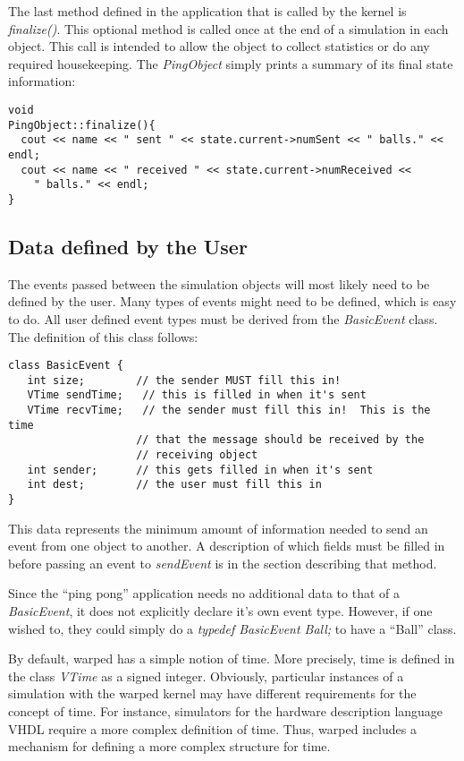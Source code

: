 \documentclass[11pt]{report}
\begin{document}
The last method defined in the application that is called by the kernel
is {\it finalize()}.  This optional method is called once at the end of
a simulation in each object.  This call is intended to allow the object
to collect statistics or do any required housekeeping.  The
{\it PingObject} simply prints a summary of its final state
information: 

\begin{verbatim}
void 
PingObject::finalize(){
  cout << name << " sent " << state.current->numSent << " balls." << endl;
  cout << name << " received " << state.current->numReceived <<
    " balls." << endl;
}
\end{verbatim}

\subsection{Data defined by the User}

The events passed between the simulation objects will most likely need
to be defined by the user.  Many types of events might need to be
defined, which is easy to do.  All user defined event types must be
derived from the {\it BasicEvent} class.  The definition of this class
follows:

\begin{verbatim}
class BasicEvent {
   int size;        // the sender MUST fill this in!
   VTime sendTime;   // this is filled in when it's sent
   VTime recvTime;   // the sender must fill this in!  This is the time
                    // that the message should be received by the
                    // receiving object
   int sender;      // this gets filled in when it's sent
   int dest;        // the user must fill this in
}
\end{verbatim}

This data represents the minimum amount of information needed to send an
event from one object to another.  A description of which fields must be
filled in before passing an event to {\it sendEvent} is in the section
describing that method.

Since the ``ping pong'' application needs no additional data to that of a
{\it BasicEvent}, it does not explicitly declare it's own event type.
However, if one wished to, they could simply do a {\it typedef BasicEvent
Ball;} to have a ``Ball'' class.

By default, {\sc warped} has a simple notion of time.  More precisely,
time is defined in the class {\it VTime} as a signed integer.  Obviously,
particular instances of a simulation with the {\sc warped} kernel may have
different requirements for the concept of time.  For instance, simulators
for the hardware description language VHDL require a more complex
definition of time.  Thus, {\sc warped} includes a mechanism for defining
a more complex structure for time.
\end{document}
